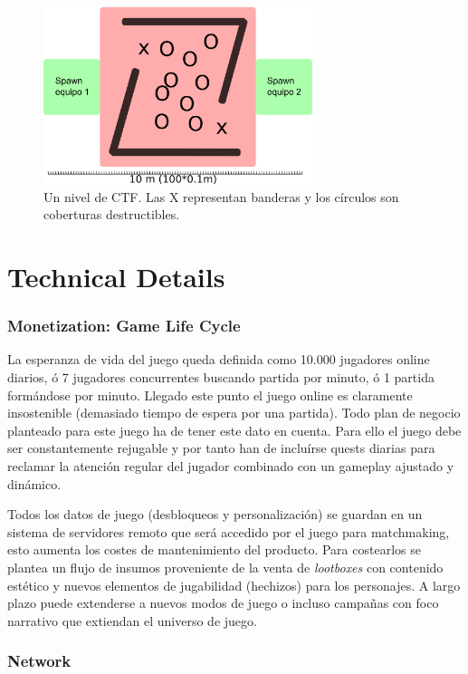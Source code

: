 \documentclass[12pt]{report}
\begin{document}
\begin{figure}[H]
    \centering
    \includegraphics[width=0.7\textwidth]{flags}
    \caption{Un nivel de CTF. Las X representan banderas y los círculos son coberturas destructibles.}
\end{figure}

\part{Technical Details}

\section{Monetization: Game Life Cycle}

La esperanza de vida del juego queda definida como 10.000 jugadores online diarios, ó 7 jugadores concurrentes buscando partida por minuto, ó 1 partida formándose por minuto. Llegado este punto el juego online es claramente insostenible (demasiado tiempo de espera por una partida). Todo plan de negocio planteado para este juego ha de tener este dato en cuenta. Para ello el juego debe ser constantemente rejugable y por tanto han de incluírse quests diarias para reclamar la atención regular del jugador combinado con un gameplay ajustado y dinámico.

Todos los datos de juego (desbloqueos y personalización) se guardan en un sistema de servidores remoto que será accedido por el juego para matchmaking, esto aumenta los costes de mantenimiento del producto. Para costearlos se plantea un flujo de insumos proveniente de la venta de \textit{lootboxes} con contenido estético y nuevos elementos de jugabilidad (hechizos) para los personajes. A largo plazo puede extenderse a nuevos modos de juego o incluso campañas con foco narrativo que extiendan el universo de juego.

\section{Network}
\end{document}
